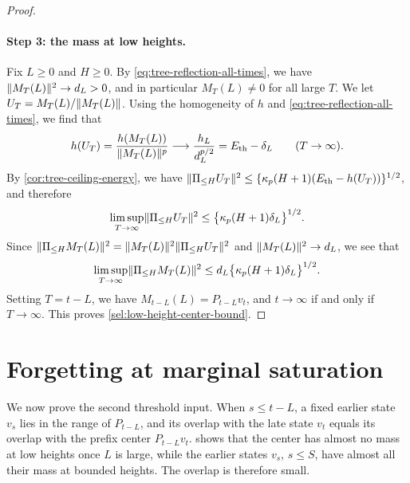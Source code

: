 \begin{proof}
\paragraph{Step 3: the mass at low heights.}
Fix $L\ge0$ and $H\ge0$. By \eqref{eq:tree-reflection-all-times}, we have $\lVert M_T(L)\rVert^2\to d_L>0$, and in particular $M_T(L)\ne0$ for all large $T$. We let $U_T=M_T(L)/\lVert M_T(L)\rVert$. Using the homogeneity of $h$ and \eqref{eq:tree-reflection-all-times}, we find that
\[
 h(U_T)=\frac{h(M_T(L))}{\lVert M_T(L)\rVert^p}\longrightarrow\frac{h_L}{d_L^{p/2}}=E_{\mathrm{th}}-\delta_L\qquad(T\to\infty).
\]
By \cref{cor:tree-ceiling-energy}, we have $\lVert\Pi_{\le H}U_T\rVert^2\le\{\kappa_p(H+1)(E_{\mathrm{th}}-h(U_T))\}^{1/2}$, and therefore
\[
 \limsup_{T\to\infty}\lVert\Pi_{\le H}U_T\rVert^2\le\bigl\{\kappa_p(H+1)\delta_L\bigr\}^{1/2}.
\]
Since $\lVert\Pi_{\le H}M_T(L)\rVert^2=\lVert M_T(L)\rVert^2\lVert\Pi_{\le H}U_T\rVert^2$ and $\lVert M_T(L)\rVert^2\to d_L$, we see that
\[
 \limsup_{T\to\infty}\lVert\Pi_{\le H}M_T(L)\rVert^2\le d_L\bigl\{\kappa_p(H+1)\delta_L\bigr\}^{1/2}.
\]
Setting $T=t-L$, we have $M_{t-L}(L)=P_{t-L}v_t$, and $t\to\infty$ if and only if $T\to\infty$. This proves \eqref{sel:low-height-center-bound}.
\end{proof}

\section{Forgetting at marginal saturation}\label{sec:tree-input-forgetting}

We now prove the second threshold input. When $s\le t-L$, a fixed earlier state $v_s$ lies in the range of $P_{t-L}$, and its overlap with the late state $v_t$ equals its overlap with the prefix center $P_{t-L}v_t$.  shows that the center has almost no mass at low heights once $L$ is large, while the earlier states $v_s$, $s\le S$, have almost all their mass at bounded heights. The overlap is therefore small.

